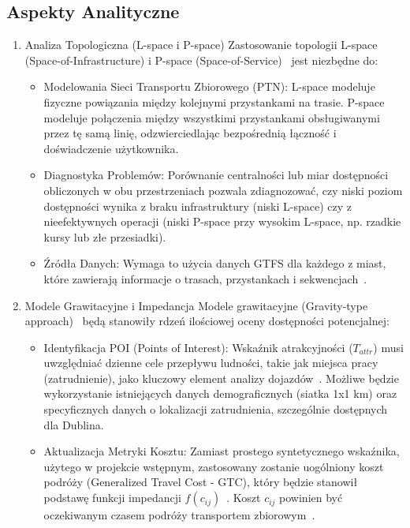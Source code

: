 \documentclass[12pt]{article}
\begin{document}
\subsection*{Aspekty Analityczne}
\begin{enumerate}
    \item Analiza Topologiczna (L-space i P-space) \newline
    Zastosowanie topologii L-space (Space-of-Infrastructure) i P-space (Space-of-Service)~\cite{dwadziesciatrzy} jest niezbędne do:
    \begin{itemize}
        \item Modelowania Sieci Transportu Zbiorowego (PTN): L-space modeluje fizyczne powiązania między kolejnymi przystankami na trasie. P-space modeluje połączenia między wszystkimi przystankami obsługiwanymi przez tę samą linię, odzwierciedlając bezpośrednią łączność i doświadczenie użytkownika.
        \item Diagnostyka Problemów: Porównanie centralności lub miar dostępności obliczonych w obu przestrzeniach pozwala zdiagnozować, czy niski poziom dostępności wynika z braku infrastruktury (niski L-space) czy z nieefektywnych operacji (niski P-space przy wysokim L-space, np. rzadkie kursy lub złe przesiadki).
        \item Źródła Danych: Wymaga to użycia danych GTFS dla każdego z miast, które zawierają informacje o trasach, przystankach i sekwencjach~\cite{dwadziesciatrzy, trzydziescipiec}.
    \end{itemize}
    \item Modele Grawitacyjne i Impedancja \newline
    Modele grawitacyjne (Gravity-type approach)~\cite{trzy} będą stanowiły rdzeń ilościowej oceny dostępności potencjalnej:
    \begin{itemize}
        \item Identyfikacja POI (Points of Interest): Wskaźnik atrakcyjności ($T_{attr}$) musi uwzględniać dzienne cele przepływu ludności, takie jak miejsca pracy (zatrudnienie), jako kluczowy element analizy dojazdów~\cite{trzy}. Możliwe będzie wykorzystanie istniejących danych demograficznych (siatka 1x1 km) oraz specyficznych danych o lokalizacji zatrudnienia, szczególnie dostępnych dla Dublina.
        \item Aktualizacja Metryki Kosztu: Zamiast prostego syntetycznego wskaźnika, użytego w projekcie wstępnym, zastosowany zostanie uogólniony koszt podróży (Generalized Travel Cost - GTC), który będzie stanowił podstawę funkcji impedancji $f(c_{ij})$~\cite{dwadziesciatrzy}. Koszt $c_{ij}$ powinien być oczekiwanym czasem podróży transportem zbiorowym~\cite{trzy}.

\end{itemize}
\end{enumerate}
\end{document}
